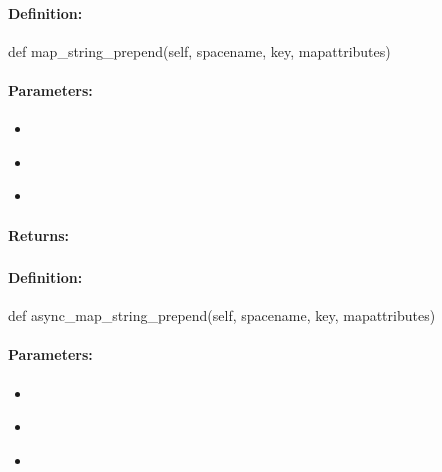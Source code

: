 \paragraph{Definition:}
\begin{pythoncode}
def map_string_prepend(self, spacename, key, mapattributes)
\end{pythoncode}

\paragraph{Parameters:}
\begin{itemize}[noitemsep]
\item {}\\

\item {}\\

\item {}\\

\end{itemize}

\paragraph{Returns:}


\pagebreak
\subsubsection{}
\label{api:python:async_map_string_prepend}


\paragraph{Definition:}
\begin{pythoncode}
def async_map_string_prepend(self, spacename, key, mapattributes)
\end{pythoncode}

\paragraph{Parameters:}
\begin{itemize}[noitemsep]
\item {}\\

\item {}\\

\item {}\\

\end{itemize}

